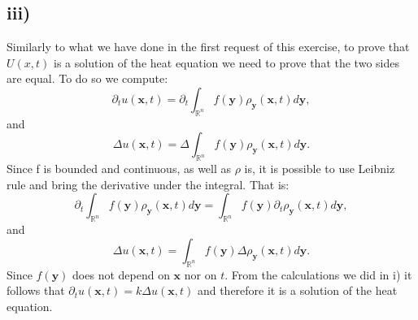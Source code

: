 \documentclass{article}[a4paper]
\begin{document}
\subsection*{iii)}
Similarly to what we have done in the first request of this exercise, to prove that $U(x,t)$ is a solution of the heat equation we need to prove that the two sides are equal. To do so we compute: 
\[
    \partial_t u(\mathbf{x},t) = \partial_t \int_{\mathbb{R}^n} f(\mathbf{y}) \rho_{\mathbf{y}} (\mathbf{x}, t) d\mathbf{y},
\]
and 
\[
    \Delta u(\mathbf{x},t) = \Delta \int_{\mathbb{R}^n} f(\mathbf{y}) \rho_{\mathbf{y}} (\mathbf{x}, t) d\mathbf{y}.
\]
Since f is bounded and continuous, as well as $\rho$ is, it is possible to use Leibniz rule and bring the derivative under the integral. That is:
\[
    \partial_t \int_{\mathbb{R}^n} f(\mathbf{y}) \rho_{\mathbf{y}} (\mathbf{x}, t) d\mathbf{y} = \int_{\mathbb{R}^n} f(\mathbf{y}) \partial_t \rho_{\mathbf{y}} (\mathbf{x}, t) d\mathbf{y},
\]
and 
\[
    \Delta u(\mathbf{x},t) = \int_{\mathbb{R}^n} f(\mathbf{y}) \Delta \rho_{\mathbf{y}} (\mathbf{x}, t) d\mathbf{y}.
\]
Since $f(\mathbf{y})$ does not depend on $\mathbf{x}$ nor on $t$. From the calculations we did in i) it follows that $\partial_t u(\mathbf{x}, t) = k \Delta u(\mathbf{x}, t)$ and therefore it is a solution of the heat equation.
\end{document}
